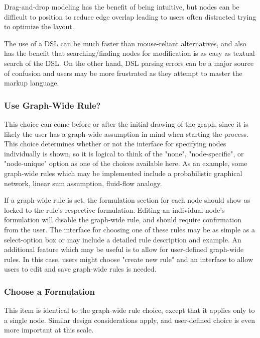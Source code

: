 \documentclass[runningheads,a4paper]{llncs}
\begin{document}
Drag-and-drop modeling has the benefit of being intuitive, but nodes can be difficult to position to reduce edge overlap leading to users often distracted trying to optimize the layout.

The use of a DSL can be much faster than mouse-reliant alternatives, and also has the benefit that searching/finding nodes for modification is as easy as textual search of the DSL.
On the other hand, DSL parsing errors can be a major source of confusion and users may be more frustrated as they attempt to master the markup language.


\subsubsection{Use Graph-Wide Rule?}
This choice can come before or after the initial drawing of the graph, since it is likely the user has a graph-wide assumption in mind when starting the process. 
This choice determines whether or not the interface for specifying nodes individually is shown, so it is logical to think of the "none", "node-specific", or "node-unique" option as one of the choices available here. 
As an example, some graph-wide rules which may be implemented include a probabilistic graphical network, linear sum assumption, fluid-flow analogy.

If a graph-wide rule is set, the formulation section for each node should show as locked to the rule's respective formulation. 
Editing an individual node's formulation will disable the graph-wide rule, and should require confirmation from the user. 
The interface for choosing one of these rules may be as simple as a select-option box or may include a detailed rule description and example. 
An additional feature which may be useful is to allow for user-defined graph-wide rules. 
In this case, users might choose "create new rule" and an interface to allow users to edit and save graph-wide rules is needed.

% 

\subsubsection{Choose a Formulation}
This item is identical to the graph-wide rule choice, except that it applies only to a single node. Similar design considerations apply, and user-defined choice is even more important at this scale.
\end{document}
